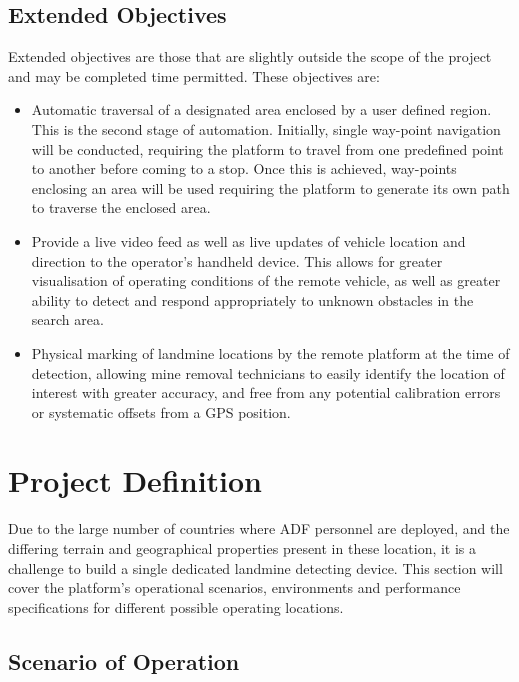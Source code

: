 \documentclass[main.tex]{subfiles}
\begin{document}
\subsection{Extended Objectives}
Extended objectives are those that are slightly outside the scope of the project and may be completed time permitted. These objectives are:

\begin{itemize}
\item Automatic traversal of a designated area enclosed by a user defined region. This is the second stage of automation. Initially, single way-point navigation will be conducted, requiring the platform to travel from one predefined point to another before coming to a stop. Once this is achieved, way-points enclosing an area will be used requiring the platform to generate its own path to traverse the enclosed area.
\item Provide a live video feed as well as live updates of vehicle location and direction to the operator's handheld device. This allows for greater visualisation of operating conditions of the remote vehicle, as well as greater ability to detect and respond appropriately to unknown obstacles in the search area.
\item Physical marking of landmine locations by the remote platform at the time of detection, allowing mine removal technicians to easily identify the location of interest with greater accuracy, and free from any potential calibration errors or systematic offsets from a GPS position.
\end{itemize}

\section{Project Definition}
Due to the large number of countries where ADF personnel are deployed, and the differing terrain and geographical properties present in these location, it is a challenge to build a single dedicated landmine detecting device. This section will cover the platform's operational scenarios, environments and performance specifications for different possible operating locations. 

\subsection{Scenario of Operation}
\end{document}
